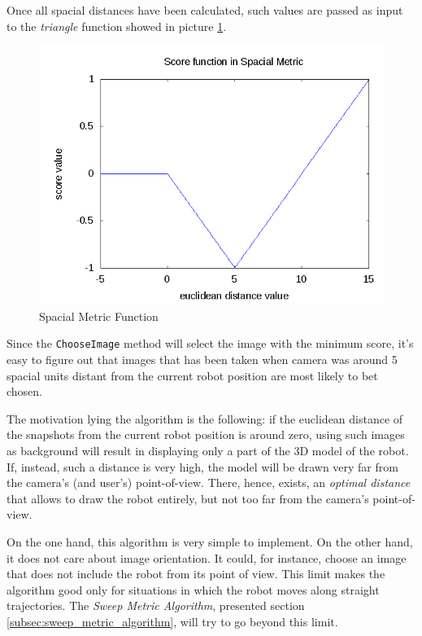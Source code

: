 %
Once all spacial distances have been calculated, such values 
are passed as input to the \textit{triangle} function 
showed in picture \ref{fig:spacial_metric_func}.
%
\begin{figure}[!h]
  \begin{center}
    \includegraphics[width=400pt]{img/spacialMetricFunc.png} 
    \caption{Spacial Metric Function}
    \label{fig:spacial_metric_func}
  \end{center}
\end{figure}
%
Since the \texttt{ChooseImage} method will select the image with 
the minimum score, it's easy to figure out that 
images that has been taken when camera was around 
5 spacial units distant from the current robot position
are most likely to bet chosen.
%

%
The motivation lying the algorithm is the following: 
if the euclidean distance of the snapshots from the current 
robot position is around zero, using such images as background 
will result in displaying only a part of the 3D model of the robot.
%
If, instead, such a distance is very high, the model will be drawn 
very far from the camera's (and user's) point-of-view.
%
There, hence, exists, an \textit{optimal distance} that allows 
to draw the robot entirely, but not too far from the camera's 
point-of-view. 
%

%
On the one hand, this algorithm is very simple to implement.
%
On the other hand, it does not care about image orientation. 
%
It could, for instance, choose an image that does not include 
the robot from its point of view. 
%
This limit makes the algorithm good only for situations 
in which the robot moves along straight trajectories.
%
The \textit{Sweep Metric Algorithm}, presented section
\ref{subsec:sweep_metric_algorithm}, will try to go beyond 
this limit.
%

